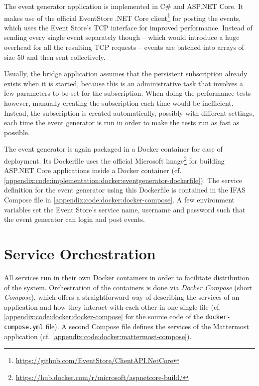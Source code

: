 The event generator application is implemented in C\# and ASP.NET Core.
It makes use of the official EventStore .NET Core client\footnote{\url{https://github.com/EventStore/ClientAPI.NetCore}} for posting the events, which uses the Event Store's \ac{TCP} interface for improved performance.
Instead of sending every single event separately though -- which would introduce a huge overhead for all the resulting \ac{TCP} requests -- events are batched into arrays of size 50 and then sent collectively.

Usually, the bridge application assumes that the persistent subscription already exists when it is started, because this is an administrative task that involves a few parameters to be set for the subscription.
When doing the performance tests however, manually creating the subscription each time would be inefficient.
Instead, the subscription is created automatically, possibly with different settings, each time the event generator is run in order to make the tests run as fast as possible.

The event generator is again packaged in a Docker container for ease of deployment.
Its Dockerfile uses the official Microsoft image\footnote{\url{https://hub.docker.com/r/microsoft/aspnetcore-build/}} for building ASP.NET Core applications inside a Docker container (cf. \cref{appendix:code:implementation:docker:eventgenerator-dockerfile}).
The service definition for the event generator using this Dockerfile is contained in the \ac{IFAS} Compose file in \cref{appendix:code:docker:docker-compose}.
A few environment variables set the Event Store's service name, username and password such that the event generator can login and post events.

\section{Service Orchestration}
\label{sec:implementation:orchestration}

All services run in their own Docker containers in order to facilitate distribution of the system.
Orchestration of the containers is done via \emph{Docker Compose} (short \emph{Compose}), which offers a straightforward way of describing the services of an application and how they interact with each other in one single file (cf. \cref{appendix:code:docker:docker-compose} for the source code of the \texttt{docker-compose.yml} file).
A second Compose file defines the services of the Mattermost application (cf. \cref{appendix:code:docker:mattermost-compose}).

